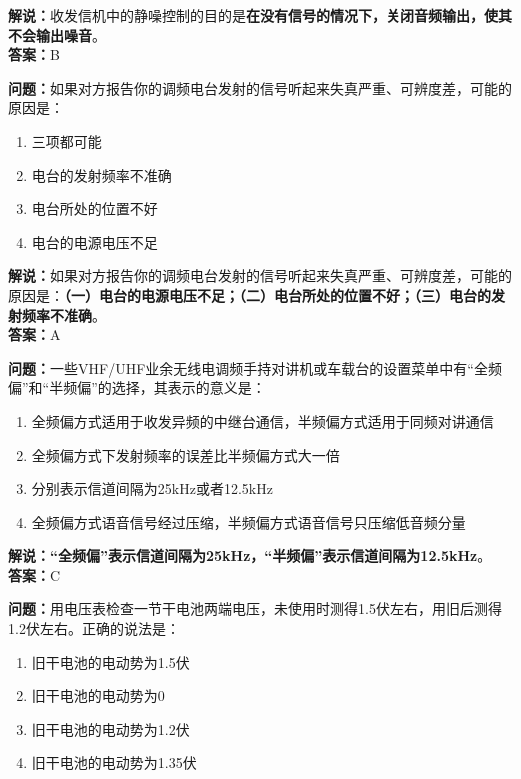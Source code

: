 \textbf{解说：}收发信机中的静噪控制的目的是\textbf{在没有信号的情况下，关闭音频输出，使其不会输出噪音}。\\\textbf{答案：}B%

\textbf{问题：}如果对方报告你的调频电台发射的信号听起来失真严重、可辨度差，可能的原因是：

\begin{enumerate}[label=\Alph*), leftmargin=1.5cm]
	\item 三项都可能
	\item 电台的发射频率不准确
	\item 电台所处的位置不好
	\item 电台的电源电压不足
\end{enumerate}

\textbf{解说：}如果对方报告你的调频电台发射的信号听起来失真严重、可辨度差，可能的原因是：\textbf{（一）电台的电源电压不足；（二）电台所处的位置不好；（三）电台的发射频率不准确}。\\\textbf{答案：}A


\textbf{问题：}一些VHF/UHF业余无线电调频手持对讲机或车载台的设置菜单中有“全频偏”和“半频偏”的选择，其表示的意义是：

\begin{enumerate}[label=\Alph*), leftmargin=1.5cm]
	\item 全频偏方式适用于收发异频的中继台通信，半频偏方式适用于同频对讲通信
	\item 全频偏方式下发射频率的误差比半频偏方式大一倍
	\item 分别表示信道间隔为25kHz或者12.5kHz
	\item 全频偏方式语音信号经过压缩，半频偏方式语音信号只压缩低音频分量
\end{enumerate}

\textbf{解说：}\textbf{“全频偏”表示信道间隔为25kHz，“半频偏”表示信道间隔为12.5kHz}。\\\textbf{答案：}C


\textbf{问题：}用电压表检查一节干电池两端电压，未使用时测得1.5伏左右，用旧后测得1.2伏左右。正确的说法是：

\begin{enumerate}[label=\Alph*), leftmargin=1.5cm]
	\item 旧干电池的电动势为1.5伏
	\item 旧干电池的电动势为0
	\item 旧干电池的电动势为1.2伏
	\item 旧干电池的电动势为1.35伏
\end{enumerate}

